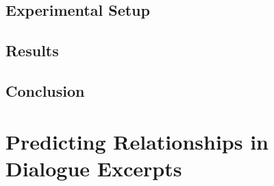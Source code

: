 \documentclass[a4paper, 12pt, twoside]{ThesisStyle}
\begin{document}
\section{Experimental Setup}

\section{Results}


\section{Conclusion}


\chapter{Predicting Relationships in Dialogue Excerpts}
\label{chap_pride}
\minitoc











\cleardoublepage
\appendix

\backmatter

\cleardoublepage


\cleardoublepage
\listoffigures
{}
\cleardoublepage
\listoftables
{}

% 

%
\end{document}
